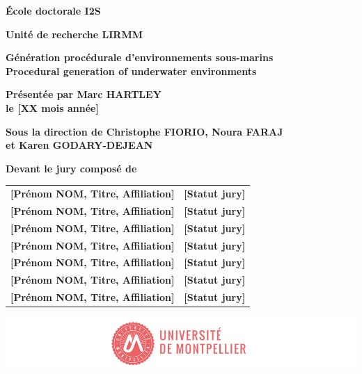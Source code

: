 \begin{titlepage}
{		\bigskip
		\textbf{École doctorale I2S}
		
		\bigskip
		\textbf{Unité de recherche LIRMM}
		
		
		\color{Titleblue}
		\fontsize{17}{20.4}\selectfont
		\vspace{2cm}
		\textbf{Génération procédurale d'environnements sous-marins\\Procedural generation of underwater environments}
		
		
		\vspace{4cm}
		\fontsize{15}{18}\selectfont
		\color{black}
		\textbf{Présentée par Marc HARTLEY \\
			le [XX mois année]}
		
		\bigskip
		\fontsize{13}{15.6}\selectfont
		\textbf{Sous la direction de Christophe FIORIO, 
			Noura FARAJ \\
			et Karen GODARY-DEJEAN}
		
		\vspace{1.5cm}
		\normalsize
		\textbf{Devant le jury composé de}\\
		\bigskip
		\fontsize{10}{12}\selectfont
		\vspace{1.5mm}
		\begin{tabular}{p{14cm}l}
			\textbf{[Prénom NOM, Titre, Affiliation]} & \textbf{[Statut jury]} \\
			\textbf{[Prénom NOM, Titre, Affiliation]} & \textbf{[Statut jury]} \\
			\textbf{[Prénom NOM, Titre, Affiliation]} & \textbf{[Statut jury]} \\
			\textbf{[Prénom NOM, Titre, Affiliation]} & \textbf{[Statut jury]} \\
			\textbf{[Prénom NOM, Titre, Affiliation]} & \textbf{[Statut jury]} \\
			\textbf{[Prénom NOM, Titre, Affiliation]} & \textbf{[Statut jury]} \\
			\textbf{[Prénom NOM, Titre, Affiliation]} & \textbf{[Statut jury]} \\
		\end{tabular} 
		
		\vspace{\fill}
		\includegraphics[scale=1]{images/PhD_Couverture_LogoUM.png}
		\vspace{-15mm}}
\end{titlepage}

